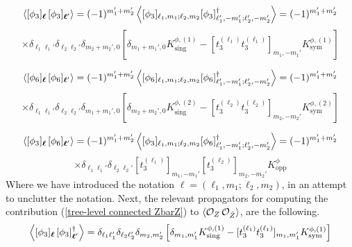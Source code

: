%
%
\begin{equation*}
\expval{
[\phi_3]_{\boldsymbol{\ell}} \,
[\phi_3]_{\boldsymbol{\ell}'}
}
=
(-1)^{m_1' + m_2'} \expval{
[\phi_3]_{\ell_1,m_1;\ell_2,m_2}
[\phi_3]^\dagger_{\ell_1',-m_1';\ell_2',-m_2'}
}
=
(-1)^{m_1' + m_2'}
\end{equation*}
%
%
\begin{equation}\label{phi3-phi3}
\times
\delta_{\ell_1 \ell_1'} \delta_{\ell_2 \ell_2'} \delta_{m_2+m_2',0}
\left[
\delta_{m_1+m_1',0} K^{\phi,(1)}_{\mathrm{sing}}
- [t_3^{(\ell_1)} t_3^{(\ell_1)}]_{m_1, -m_1'} K^{\phi,(1)}_{\mathrm{sym}}
\right]
\end{equation}
%
%

%
%
\begin{equation*}
\expval{
[\phi_6]_{\boldsymbol{\ell}} \,
[\phi_6]_{\boldsymbol{\ell}'}
}
=
(-1)^{m_1' + m_2'} \expval{
[\phi_6]_{\ell_1,m_1;\ell_2,m_2}
[\phi_6]^\dagger_{\ell_1',-m_1';\ell_2',-m_2'}
}
=
(-1)^{m_1' + m_2'}
\end{equation*}
%
%
\begin{equation}\label{phi6-phi6}
\times
\delta_{\ell_1 \ell_1'} \delta_{\ell_2 \ell_2'} \delta_{m_1+m_1',0}
\left[
\delta_{m_2+m_2',0} K^{\phi,(2)}_{\mathrm{sing}}
- [t_3^{(\ell_2)} t_3^{(\ell_2)}]_{m_2, -m_2'} K^{\phi,(2)}_{\mathrm{sym}}
\right]
\end{equation}
%
%

%
%
\begin{equation*}
\expval{
[\phi_3]_{\boldsymbol{\ell}} \,
[\phi_6]_{\boldsymbol{\ell}'}
}
=
(-1)^{m_1' + m_2'} \expval{
[\phi_3]_{\ell_1,m_1;\ell_2,m_2}
[\phi_6]^\dagger_{\ell_1',-m_1';\ell_2',-m_2'}
}
=
(-1)^{m_1' + m_2'}
\end{equation*}
%
%
\begin{equation}\label{phi3-phi6}
\times
\delta_{\ell_1 \ell_1'} \delta_{\ell_2 \ell_2'}
[t_3^{(\ell_1)}]_{m_1, -m_1'} [t_3^{(\ell_2)}]_{m_2, -m_2'} K^{\phi}_{\mathrm{opp}}
\end{equation}
%
%
Where we have introduced the notation $\boldsymbol{\ell} = (\ell_1,m_1;\ell_2,m_2)$, in an attempt to unclutter the notation. Next, the relevant propagators for computing the contribution (\ref{tree-level connected ZbarZ}) to $\expval{\mathcal{O}_{Z} \, \mathcal{O}_{\bar{Z}}}$, are the following.
%
%
\begin{equation}\label{phi3-phibar3}
\expval{
[\phi_3]_{\boldsymbol{\ell}} \,
[\phi_3]^\dagger_{\boldsymbol{\ell}'}
}
=
\delta_{\ell_1 \ell_1'} \delta_{\ell_2 \ell_2'} \delta_{m_2,m_2'}
\left[
\delta_{m_1,m_1'} K^{\phi,(1)}_{\mathrm{sing}}
- [t_3^{(\ell_1)} t_3^{(\ell_1)}]_{m_1, m_1'} K^{\phi,(1)}_{\mathrm{sym}}
\right]
\end{equation}
%
%

